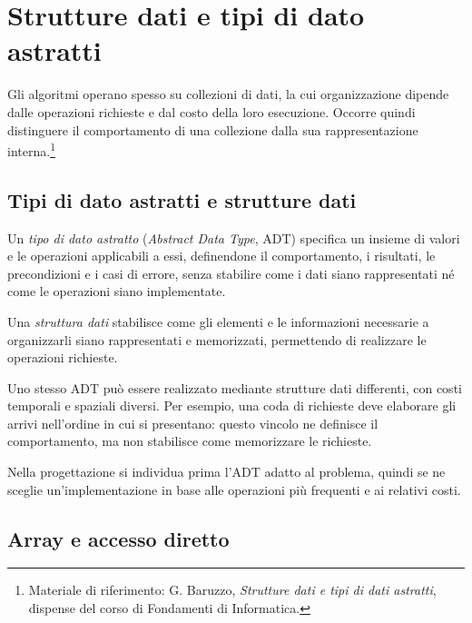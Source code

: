 \chapter{Strutture dati e tipi di dato astratti}
\label{chap:strutture-dati-adt}

Gli algoritmi operano spesso su collezioni di dati, la cui organizzazione
dipende dalle operazioni richieste e dal costo della loro esecuzione.
Occorre quindi distinguere il comportamento di una collezione dalla
sua rappresentazione interna.\footnote{Materiale
di riferimento: G. Baruzzo, \emph{Strutture dati e tipi di dati astratti},
dispense del corso di Fondamenti di Informatica.}

\section{Tipi di dato astratti e strutture dati}
\label{sec:fi-adt-strutture}

\begin{definition}
\label{def:fi-adt}
Un \emph{tipo di dato astratto} (\emph{Abstract Data Type}, ADT)
specifica un insieme di valori e le operazioni applicabili a essi,
definendone il comportamento, i risultati, le precondizioni e i casi
di errore, senza stabilire come i dati siano rappresentati né come
le operazioni siano implementate.
\end{definition}

\begin{definition}
\label{def:fi-struttura-dati}
Una \emph{struttura dati} stabilisce come gli elementi e le
informazioni necessarie a organizzarli siano rappresentati e
memorizzati, permettendo di realizzare le operazioni richieste.
\end{definition}

Uno stesso ADT può essere realizzato mediante strutture dati
differenti, con costi temporali e spaziali diversi. Per esempio,
una coda di richieste deve elaborare gli arrivi nell'ordine in cui
si presentano: questo vincolo ne definisce il comportamento, ma
non stabilisce come memorizzare le richieste.

Nella progettazione si individua prima l'ADT adatto al problema,
quindi se ne sceglie un'implementazione in base alle operazioni
più frequenti e ai relativi costi.

\section{Array e accesso diretto}
\label{sec:fi-strutture-array}

